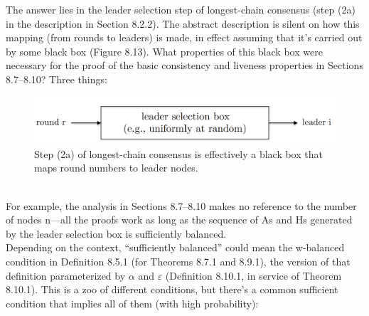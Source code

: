 The answer lies in the leader selection step of longest-chain consensus (step (2a) in the description in Section 8.2.2). The abstract description is silent on how this mapping (from rounds
to leaders) is made, in effect assuming that it’s carried out by some black box (Figure 8.13).
What properties of this black box were necessary for the proof of the basic consistency and
liveness properties in Sections 8.7–8.10? Three things:
\\
\begin{figure}[h]
    \centering
    \includegraphics[scale = 0.5]{figures/f34.png}
    \caption{ Step (2a) of longest-chain consensus is effectively a black box that maps round
numbers to leader nodes.}
    \label{fig:mesh1}
\end{figure}\\
For example, the analysis in Sections 8.7–8.10 makes no reference to the number of nodes n—all
the proofs work as long as the sequence of As and Hs generated by the leader selection box
is sufficiently balanced.\\
Depending on the context, “sufficiently balanced” could mean the w-balanced condition
in Definition 8.5.1 (for Theorems 8.7.1 and 8.9.1), the version of that definition parameterized
by $\alpha$ and $\varepsilon$ (Definition 8.10.1, in service of Theorem 8.10.1). This is a
zoo of different conditions, but there’s a common sufficient condition that implies all of them
(with high probability):


